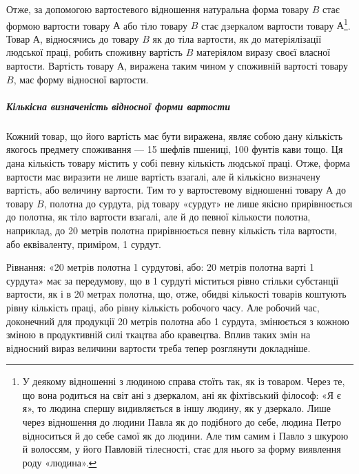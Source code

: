 Отже, за допомогою вартостевого відношення натуральна форма
товару $B$ стає формою вартости товару $А$ або тіло товару $B$
стає дзеркалом вартости товару $А$\footnote{
У деякому відношенні з людиною справа стоїть так, як із товаром.
Через те, що вона родиться на світ ані з дзеркалом, ані як фіхтівський
філософ: «Я є я», то людина спершу видивляється в іншу людину, як у
дзеркало. Лише через відношення до людини Павла як до подібного до
себе, людина Петро відноситься й до себе самої як до людини. Але тим
самим і Павло з шкурою й волоссям, у його Павловій тілесності, стає для
нього за форму виявлення роду «людина».
}. Товар $А$, відносячись до товару
$B$ як до тіла вартости, як до матеріялізації людської праці, робить
споживну вартість $B$ матеріялом виразу своєї власної вартости.
Вартість товару $А$, виражена таким чином у споживній
вартості товару $B$, має форму відносної вартости.

\subparagraph{Кількісна визначеність відносної форми вартости}

Кожний товар, що його вартість має бути виражена, являє собою
дану кількість якогось предмету споживання — 15 шефлів
пшениці, 100 фунтів кави тощо. Ця дана кількість товару містить
у собі певну кількість людської праці. Отже, форма вартости має
виразити не лише вартість взагалі, але й кількісно визначену
вартість, або величину вартости. Тим то у вартостевому відношенні
товару $А$ до товару $B$, полотна до сурдута, рід товару «сурдут»
не лише якісно прирівнюється до полотна, як тіло вартости
взагалі, але й до певної кількости полотна, наприклад, до 20 метрів
полотна прирівнюється певну кількість тіла вартости, або
еквіваленту, приміром, 1 сурдут.

Рівнання: «20 метрів полотна \deq{} 1 сурдутові, або: 20 метрів
полотна варті 1 сурдута» має за передумову, що в 1 сурдуті міститься
рівно стільки субстанції вартости, як і в 20 метрах полотна,
що, отже, обидві кількості товарів коштують рівну кількість
праці, або рівну кількість робочого часу. Але робочий час,
доконечний для продукції 20 метрів полотна або 1 сурдута, змінюється
з кожною зміною в продуктивній силі ткацтва або кравецтва.
Вплив таких змін на відносний вираз величини вартости
треба тепер розглянути докладніше.

